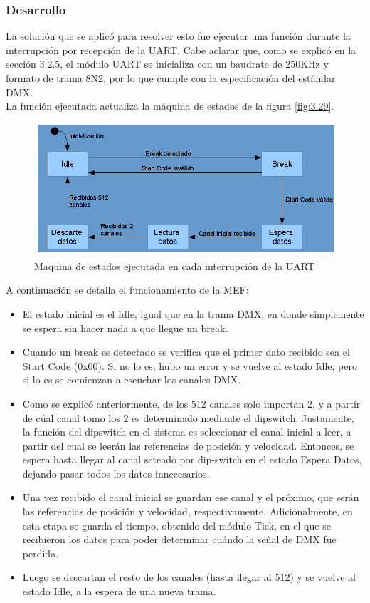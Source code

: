 \subsubsection{Desarrollo}
La solución que se aplicó para resolver esto fue ejecutar una función durante la interrupción por recepción de la UART. Cabe aclarar que, como se explicó en la sección 3.2.5, el  módulo UART se inicializa con un baudrate de 250KHz y formato de trama 8N2, por lo que cumple con la especificación del estándar DMX. \\
La función ejecutada actualiza la máquina de estados de la figura \ref{fig:3.29}.

\begin{figure}[!ht]
	\centering
	\includegraphics[width=16cm,scale=1]{resources/3_29-moduloDMXmef.png}
	\caption{Maquina de estados ejecutada en cada interrupción de la UART}
	\label{fig:\thefigure}
\end{figure}

A continuación se detalla el funcionamiento de la MEF:
\begin{itemize}
	\item El estado inicial es el Idle, igual que en la trama DMX, en donde simplemente se espera sin hacer nada a que llegue un break.
	\item Cuando un break es detectado se verifica que el primer dato recibido sea el Start Code (0x00). Si no lo es, hubo un error y se vuelve al estado Idle, pero si lo es se comienzan a escuchar los canales DMX.
	\item Como se explicó anteriormente, de los 512 canales solo importan 2, y a partír de cúal canal tomo los 2 es determinado mediante el dipswitch. Justamente, la función del dipswitch en el sistema es seleccionar el canal inicial a leer, a partir del cual se leerán las referencias de posición y velocidad. Entonces, se espera hasta llegar al canal seteado por dip-switch en el estado Espera Datos, dejando pasar todos los datos innecesarios.
	\item Una vez recibido el canal inicial se guardan ese canal y el próximo, que serán las referencias de posición y velocidad, respectivamente. Adicionalmente, en esta etapa se guarda el tiempo, obtenido del módulo Tick, en el que se recibieron los datos para poder determinar cuándo la señal de DMX fue perdida.
	\item Luego se descartan el resto de los canales (hasta llegar al 512) y se vuelve al estado Idle, a la espera de una nueva trama.
\end{itemize}

